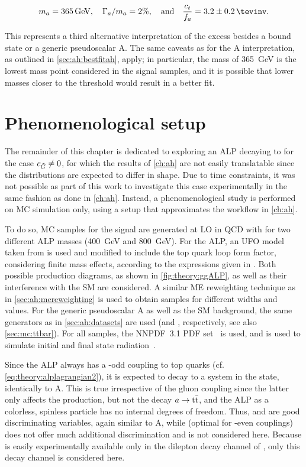\begin{equation*}
    m_a = \SI{365}{\GeV}, \quad \Gamma_a / m_a = 2\%, \quad \text{and} \quad \frac{\ct}{f_a} = 3.2 \pm 0.2 \, \si{\tevinv}.
\end{equation*}

This represents a third alternative interpretation of the excess besides a \ttbar bound state or a generic pseudoscalar A. The same caveats as for the A interpretation, as outlined in \cref{sec:ah:bestfitah}, apply; in particular, the mass of \SI{365}{\GeV} is the lowest mass point considered in the signal samples, and it is possible that lower masses closer to the \ttbar threshold would result in a better fit.

\section{Phenomenological setup}
\label{sec:alps:setup}

The remainder of this chapter is dedicated to exploring an ALP decaying to \ttbar for the case $c_{\tilde{G}} \neq 0$, for which the results of \cref{ch:ah} are not easily translatable since the distributions are expected to differ in shape. Due to time constraints, it was not possible as part of this work to investigate this case experimentally in the same fashion as done in \cref{ch:ah}. Instead, a phenomenological study is performed on MC simulation only, using a setup that approximates the workflow in \cref{ch:ah}.

To do so, MC samples for the signal are generated at LO in QCD with \amcatnlo for two different ALP masses (\SI{400}{\GeV} and \SI{800}{\GeV}). For the ALP, an UFO model taken from  is used and modified to include the top quark loop form factor, considering finite mass effects, according to the expressions given in . Both possible production diagrams, as shown in \cref{fig:theory:ggALP}, as well as their interference with the SM are considered. A similar ME reweighting technique as in \cref{sec:ah:mereweighting} is used to obtain samples for different widths and \cG values. For the generic pseudoscalar A as well as the SM \ttbar background, the same generators as in \cref{sec:ah:datasets} are used (\amcatnlo and \powhegvtwo \hvq, respectively, see also \cref{sec:mc:ttbar}). For all samples, the NNPDF~3.1 PDF set~\cite{NNPDF:2017mvq} is used, and  is used to simulate initial and final state radiation~\cite{Pythia:2015}.

Since the ALP always has a \CP-odd coupling to top quarks (cf. \cref{eq:theory:alplagrangian2}), it is expected to decay to a \ttbar system in the  state, identically to A. This is true irrespective of the gluon coupling \cG since the latter only affects the production, but not the decay $a \rightarrow \mathrm{t \bar{t}}$, and the ALP as a colorless, spinless particle has no internal degrees of freedom. Thus, \mtt and \chel are good discriminating variables, again similar to A, while \chan (optimal for \CP-even couplings) does not offer much additional discrimination and is not considered here. Because \chel is easily experimentally available only in the dilepton decay channel of \ttbar, only this decay channel is considered here.

